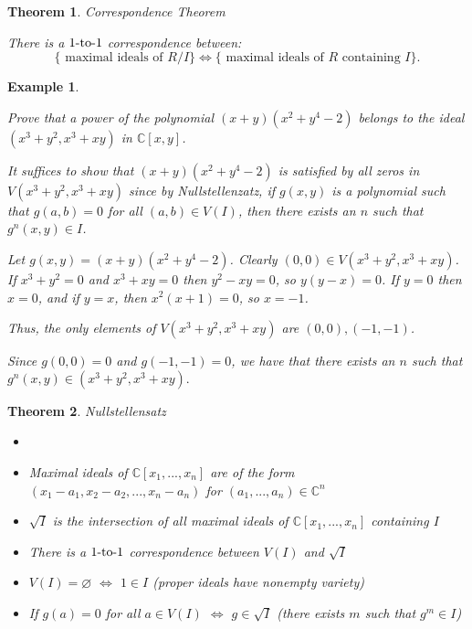\documentclass[12pt]{Qual}
\newtheorem{theorem}{Theorem}
\newtheorem{example}{Example}
\begin{document}
\vspace{0.5cm}
\begin{theorem}{\Large\textit{Correspondence Theorem}}

There is a $1\text{-to-}1$ correspondence between: $$\{\text{ maximal ideals of } R/I\} \Longleftrightarrow \{\text{ maximal ideals of }R\text{ containing } I\}.$$

\end{theorem}
\vspace{0.5cm}
\begin{example}
$\,$

\begin{framed}
Prove that a power of the polynomial $(x+y)(x^2+y^4-2)$ belongs to the ideal $(x^3+y^2,x^3+xy)$ in $\mathbb{C}[x,y]$.
\end{framed}

It suffices to show that $(x+y)(x^2+y^4-2)$ is satisfied by all zeros in $V(x^3+y^2,x^3+xy)$ since by Nullstellenzatz, if $g(x,y)$ is a polynomial such that $g(a,b)=0$ for all $(a,b)\in V(I)$, then there exists an $n$ such that $g^n(x,y)\in I$.

Let $g(x,y)=(x+y)(x^2+y^4-2)$. Clearly $(0,0)\in V(x^3+y^2,x^3+xy)$. If $x^3+y^2=0$ and $x^3+xy=0$ then $y^2-xy=0$, so $y(y-x)=0$. If $y=0$ then $x=0$, and if $y=x$, then $x^2(x+1)=0$, so $x=-1$.

Thus, the only elements of $V(x^3+y^2,x^3+xy)$ are $(0,0),(-1,-1)$.

Since $g(0,0)=0$ and $g(-1,-1)=0$, we have that there exists an $n$ such that $g^n(x,y)\in(x^3+y^2,x^3+xy).$
\end{example}
\vspace{0.5cm}
\begin{theorem}{\Large\textit{Nullstellensatz}}

\begin{itemize}
\renewcommand\labelitemi{\faPuzzlePiece}
    \item
    \item Maximal ideals of $\mathbb{C}[x_1,...,x_n]$ are of the form $(x_1-a_1,x_2-a_2,...,x_n-a_n)$ for $(a_1,...,a_n)\in\mathbb{C}^n$
    \item $\sqrt{I}$ is the intersection of all maximal ideals of $\mathbb{C}[x_1,...,x_n]$ containing $I$
    \item There is a $1\text{-to-}1$ correspondence between $V(I)$ and $\sqrt{I}$
    \item $V(I)=\varnothing$ $\iff$ $1\in I$ (proper ideals have nonempty variety)
    \item If $g(a)=0$ for all $a\in V(I)$ $\iff$ $g\in\sqrt{I}$ (there exists $m$ such that $g^m\in I$)
\end{itemize}

\end{theorem}
\end{document}
